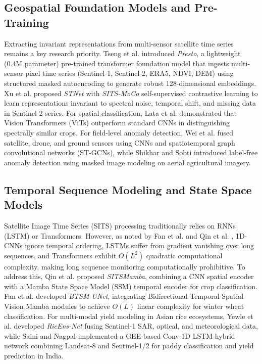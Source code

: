 \documentclass[conference]{IEEEtran}
\begin{document}
\subsection{Geospatial Foundation Models and Pre-Training}
Extracting invariant representations from multi-sensor satellite time series remains a key research priority. Tseng et al. \cite{b4} introduced \textit{Presto}, a lightweight (0.4M parameter) pre-trained transformer foundation model that ingests multi-sensor pixel time series (Sentinel-1, Sentinel-2, ERA5, NDVI, DEM) using structured masked autoencoding to generate robust 128-dimensional embeddings. Xu et al. \cite{b15} proposed \textit{STNet} with \textit{SITS-MoCo} self-supervised contrastive learning to learn representations invariant to spectral noise, temporal shift, and missing data in Sentinel-2 series. For spatial classification, Lata et al. \cite{b3} demonstrated that Vision Transformers (ViTs) outperform standard CNNs in distinguishing spectrally similar crops. For field-level anomaly detection, Wei et al. \cite{b14} fused satellite, drone, and ground sensors using CNNs and spatiotemporal graph convolutional networks (ST-GCNs), while Shikhar and Sobti \cite{b17} introduced label-free anomaly detection using masked image modeling on aerial agricultural imagery.

\subsection{Temporal Sequence Modeling and State Space Models}
Satellite Image Time Series (SITS) processing traditionally relies on RNNs (LSTM) or Transformers. However, as noted by Fan et al. \cite{b1} and Qin et al. \cite{b5}, 1D-CNNs ignore temporal ordering, LSTMs suffer from gradient vanishing over long sequences, and Transformers exhibit $O(L^2)$ quadratic computational complexity, making long sequence monitoring computationally prohibitive. To address this, Qin et al. \cite{b5} proposed \textit{SITSMamba}, combining a CNN spatial encoder with a Mamba State Space Model (SSM) temporal encoder for crop classification. Fan et al. \cite{b1} developed \textit{BTSM-UNet}, integrating Bidirectional Temporal-Spatial Vision Mamba modules to achieve $O(L)$ linear complexity for winter wheat classification. For multi-modal yield modeling in Asian rice ecosystems, Yewle et al. \cite{b13} developed \textit{RicEns-Net} fusing Sentinel-1 SAR, optical, and meteorological data, while Saini and Nagpal \cite{b21} implemented a GEE-based Conv-1D LSTM hybrid network combining Landsat-8 and Sentinel-1/2 for paddy classification and yield prediction in India.
\end{document}
